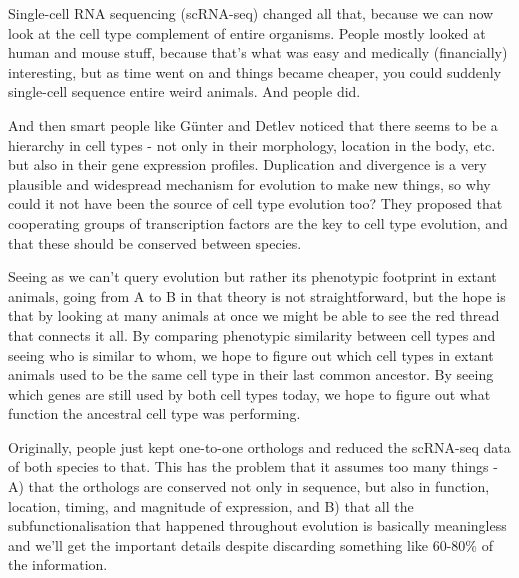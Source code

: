 \documentclass{article}
\begin{document}
Single-cell RNA sequencing (scRNA-seq) changed all that, because we can now look at the cell type
complement of entire organisms. People mostly looked at human and mouse stuff, because that's what
was easy and medically (financially) interesting, but as time went on and things became cheaper, you
could suddenly single-cell sequence entire weird animals. And people did.

And then smart people like Günter and Detlev noticed that there seems to be a hierarchy in cell
types - not only in their morphology, location in the body, etc. but also in their gene expression
profiles. Duplication and divergence is a very plausible and widespread mechanism for evolution to
make new things, so why could it not have been the source of cell type evolution too? They proposed
that cooperating groups of transcription factors are the key to cell type evolution, and that these
should be conserved between species.

Seeing as we can't query evolution but rather its phenotypic footprint in extant animals, going from
A to B in that theory is not straightforward, but the hope is that by looking at many animals at
once we might be able to see the red thread that connects it all. By comparing phenotypic similarity
between cell types and seeing who is similar to whom, we hope to figure out which cell types in
extant animals used to be the same cell type in their last common ancestor. By seeing which genes
are still used by both cell types today, we hope to figure out what function the ancestral cell type
was performing.

Originally, people just kept one-to-one orthologs and reduced the scRNA-seq data of both species to
that. This has the problem that it assumes too many things - A) that the orthologs are conserved not
only in sequence, but also in function, location, timing, and magnitude of expression, and B) that
all the subfunctionalisation that happened throughout evolution is basically meaningless and we'll
get the important details despite discarding something like 60-80\% of the information.

% 
% 
% 
\end{document}
